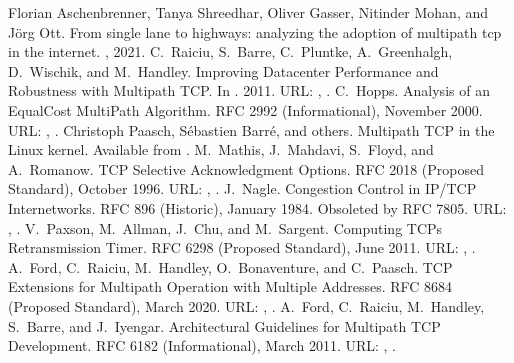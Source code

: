 \documentclass[letterpaper,10pt,english]{sphinxmanual}
\begin{document}
\begin{sphinxthebibliography}{10}
\sphinxAtStartPar
Florian Aschenbrenner, Tanya Shreedhar, Oliver Gasser, Nitinder Mohan, and Jörg Ott. From single lane to highways: analyzing the adoption of multipath tcp in the internet. , 2021.
\sphinxAtStartPar
C. Raiciu, S. Barre, C. Pluntke, A. Greenhalgh, D. Wischik, and M. Handley. Improving Datacenter Performance and Robustness with Multipath TCP. In . 2011. URL: , .
\sphinxAtStartPar
C. Hopps. Analysis of an Equal\sphinxhyphen{}Cost Multi\sphinxhyphen{}Path Algorithm. RFC 2992 (Informational), November 2000. URL: , .
\sphinxAtStartPar
Christoph Paasch, Sébastien Barré, and others. Multipath TCP in the Linux kernel. Available from .
\sphinxAtStartPar
M. Mathis, J. Mahdavi, S. Floyd, and A. Romanow. TCP Selective Acknowledgment Options. RFC 2018 (Proposed Standard), October 1996. URL: , .
\sphinxAtStartPar
J. Nagle. Congestion Control in IP/TCP Internetworks. RFC 896 (Historic), January 1984. Obsoleted by RFC 7805. URL: , .
\sphinxAtStartPar
V. Paxson, M. Allman, J. Chu, and M. Sargent. Computing TCP\textquotesingle{}s Retransmission Timer. RFC 6298 (Proposed Standard), June 2011. URL: , .
\sphinxAtStartPar
A. Ford, C. Raiciu, M. Handley, O. Bonaventure, and C. Paasch. TCP Extensions for Multipath Operation with Multiple Addresses. RFC 8684 (Proposed Standard), March 2020. URL: , .
\sphinxAtStartPar
A. Ford, C. Raiciu, M. Handley, S. Barre, and J. Iyengar. Architectural Guidelines for Multipath TCP Development. RFC 6182 (Informational), March 2011. URL: , .

\end{sphinxthebibliography}
\end{document}

